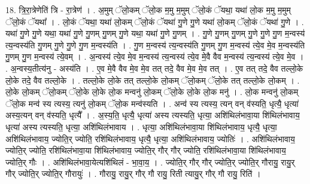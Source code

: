 \documentclass[17pt]{extarticle}
\begin{document}
18. त्रि॒रा॒त्रेणेति॑ त्रि - रा॒त्रेण॑ । . अ॒मुम् ॅलो॒कम् ॅलो॒क म॒मु म॒मुम् ॅलो॒कं ॅयथा॒ यथा॑ लो॒क म॒मु म॒मुम् ॅलो॒कं ॅयथा᳚ । . लो॒कं ॅयथा॒ यथा॑ लो॒कम् ॅलो॒कं ॅयथा॑ गु॒णे गु॒णे यथा॑ लो॒कम् ॅलो॒कं ॅयथा॑ गु॒णे । . यथा॑ गु॒णे गु॒णे यथा॒ यथा॑ गु॒णे गु॒णम् गु॒णम् गु॒णे यथा॒ यथा॑ गु॒णे गु॒णम् । . गु॒णे गु॒णम् गु॒णम् गु॒णे गु॒णे गु॒ण म॒न्वस्य॑ त्य॒न्वस्य॑ति गु॒णम् गु॒णे गु॒णे गु॒ण म॒न्वस्य॑ति । . गु॒ण म॒न्वस्य॑ त्य॒न्वस्य॑ति गु॒णम् गु॒ण म॒न्वस्य॑ त्ये॒व मे॒व म॒न्वस्य॑ति गु॒णम् गु॒ण म॒न्वस्य॑ त्ये॒वम् । . अ॒न्वस्य॑ त्ये॒व मे॒व म॒न्वस्य॑ त्य॒न्वस्य॑ त्ये॒व मे॒वै वैव म॒न्वस्य॑ त्य॒न्वस्य॑ त्ये॒व मे॒व । . अ॒न्वस्य॒तीत्य॑नु - अस्य॑ति । . ए॒व मे॒वै वैव मे॒व मे॒व तत् तदे॒ वैव मे॒व मे॒व तत् । . ए॒व तत् तदे॒ वैव तल्लो॒के लो॒के तदे॒ वैव तल्लो॒के । . तल्लो॒के लो॒के तत् तल्लो॒के लो॒कम् ॅलो॒कम् ॅलो॒के तत् तल्लो॒के लो॒कम् । . लो॒के लो॒कम् ॅलो॒कम् ॅलो॒के लो॒के लो॒क मन्वनु॑ लो॒कम् ॅलो॒के लो॒के लो॒क मनु॑ । . लो॒क मन्वनु॑ लो॒कम् ॅलो॒क मन्व॑ स्य त्यस्य॒ त्यनु॑ लो॒कम् ॅलो॒क मन्व॑स्यति । . अन्व॑ स्य त्यस्य॒ त्यन् वन् व॑स्यति॒ धृत्यै॒ धृत्या॑ अस्य॒त्यन् वन् व॑स्यति॒ धृत्यै᳚ । . अ॒स्य॒ति॒ धृत्यै॒ धृत्या॑ अस्य त्यस्यति॒ धृत्या॒ अशि॑थिलंभावा॒या शि॑थिलंभावाय॒ धृत्या॑ अस्य त्यस्यति॒ धृत्या॒ अशि॑थिलंभावाय । . धृत्या॒ अशि॑थिलंभावा॒या शि॑थिलंभावाय॒ धृत्यै॒ धृत्या॒ अशि॑थिलंभावाय॒ ज्योति॒र् ज्योति॒ रशि॑थिलंभावाय॒ धृत्यै॒ धृत्या॒ अशि॑थिलंभावाय॒ ज्योतिः॑ । . अशि॑थिलंभावाय॒ ज्योति॒र् ज्योति॒ रशि॑थिलंभावा॒या शि॑थिलंभावाय॒ ज्योति॒र् गौर् गौर् ज्योति॒ रशि॑थिलंभावा॒या शि॑थिलंभावाय॒ ज्योति॒र् गौः । . अशि॑थिलंभावा॒येत्यशि॑थिलं - भा॒वा॒य॒ । . ज्योति॒र् गौर् गौर् ज्योति॒र् ज्योति॒र् गौरायु॒ रायु॒र् गौर् ज्योति॒र् ज्योति॒र् गौरायुः॑ । . गौरायु॒ रायु॒र् गौर् गौ रायु॒ रिती त्यायु॒र् गौर् गौ रायु॒ रिति॑ । \newline
\end{document}
